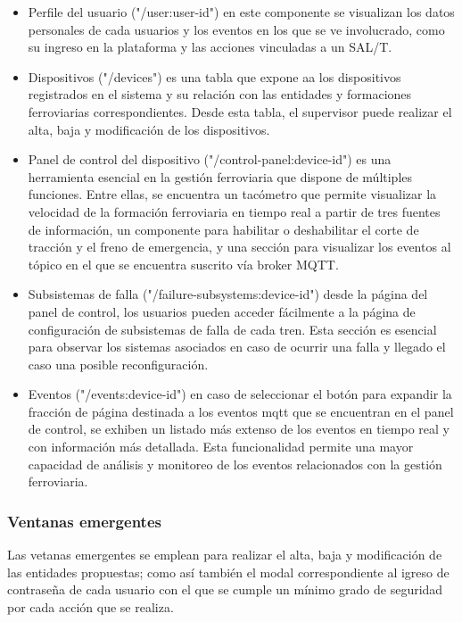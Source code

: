 \begin{itemize}
  \item Perfile del usuario ("/user:user-id")
    en este componente se visualizan los datos personales de cada usuarios y los eventos en los que se ve involucrado, como su ingreso en la plataforma y las acciones vinculadas a un SAL/T. 

  \item Dispositivos ("/devices")
    es una tabla que expone aa los dispositivos registrados en el sistema y su relación con las entidades y formaciones ferroviarias correspondientes. Desde esta tabla, el supervisor puede realizar el alta, baja y modificación de los dispositivos.

  \item Panel de control del dispositivo ("/control-panel:device-id")
    es una herramienta esencial en la gestión ferroviaria que dispone de múltiples funciones. Entre ellas, se encuentra un tacómetro que permite visualizar la velocidad de la formación ferroviaria en tiempo real a partir de tres fuentes de información, un componente para habilitar o deshabilitar el corte de tracción y el freno de emergencia, y una sección para visualizar los eventos al tópico en el que se encuentra suscrito vía broker MQTT.


  \item Subsistemas de falla ("/failure-subsystems:device-id")
    desde la página del panel de control, los usuarios pueden acceder fácilmente a la página de configuración de subsistemas de falla de cada tren. Esta sección es esencial para observar los sistemas asociados en caso de ocurrir una falla y llegado el caso una posible reconfiguración.

  \item Eventos ("/events:device-id")
    en caso de seleccionar el botón para expandir la fracción de página destinada a los eventos mqtt que se encuentran en el panel de control, se exhiben un listado más extenso de los eventos en tiempo real y con información más detallada. Esta funcionalidad permite una mayor capacidad de análisis y monitoreo de los eventos relacionados con la gestión ferroviaria.


\end{itemize}


\subsubsection{Ventanas emergentes}

Las vetanas emergentes se emplean para realizar el alta, baja y modificación de las entidades propuestas; como así también el modal correspondiente al igreso de contraseña de cada usuario con el que se cumple un mínimo grado de seguridad por cada acción que se realiza. 


